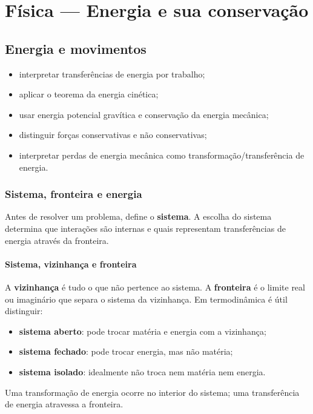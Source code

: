 \documentclass[11pt,a4paper,oneside]{book}
\begin{document}
\part{Física — Energia e sua conservação}

\chapter{Energia e movimentos}

\begin{objetivos}
\begin{itemize}
  \item interpretar transferências de energia por trabalho;
  \item aplicar o teorema da energia cinética;
  \item usar energia potencial gravítica e conservação da energia mecânica;
  \item distinguir forças conservativas e não conservativas;
  \item interpretar perdas de energia mecânica como transformação/transferência de energia.
\end{itemize}
\end{objetivos}

\section{Sistema, fronteira e energia}
Antes de resolver um problema, define o \textbf{sistema}. A escolha do sistema determina que interações são internas e quais representam transferências de energia através da fronteira.

\subsection*{Sistema, vizinhança e fronteira}
A \textbf{vizinhança} é tudo o que não pertence ao sistema. A \textbf{fronteira} é o limite real ou imaginário que separa o sistema da vizinhança. Em termodinâmica é útil distinguir:
\begin{itemize}
  \item \textbf{sistema aberto}: pode trocar matéria e energia com a vizinhança;
  \item \textbf{sistema fechado}: pode trocar energia, mas não matéria;
  \item \textbf{sistema isolado}: idealmente não troca nem matéria nem energia.
\end{itemize}
Uma transformação de energia ocorre no interior do sistema; uma transferência de energia atravessa a fronteira.
\end{document}
